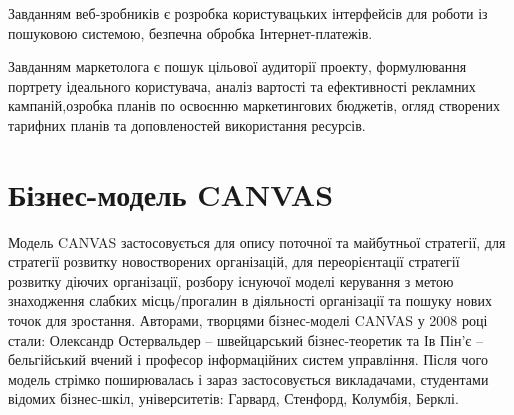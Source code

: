 Завданням веб-зробників є розробка користувацьких інтерфейсів для роботи із пошуковою системою, безпечна обробка Інтернет-платежів.

Завданням маркетолога є пошук цільової аудиторії проекту, формулювання портрету ідеального користувача, аналіз вартості та ефективності рекламних кампаній,озробка планів по освоєнню маркетингових бюджетів,
огляд створених тарифних планів та доповленостей використання ресурсів.

\section{Бізнес-модель CANVAS}
Модель CANVAS застосовується для опису поточної та майбутньої стратегії,
для стратегії розвитку новостворених організацій, для переорієнтації
стратегії розвитку діючих організації, розбору існуючої моделі
керування з метою знаходження слабких місць/прогалин в діяльності організації
та пошуку нових точок для зростання. Авторами, творцями бізнес-моделі CANVAS
у 2008 році стали: Олександр Остервальдер –  швейцарський бізнес-теоретик та
Ів Пін’є –  бельгійський вчений і професор інформаційних систем управління.
Після чого модель стрімко поширювалась і зараз застосовується викладачами,
студентами відомих бізнес-шкіл, університетів: Гарвард, Стенфорд, Колумбія, Берклі.\\

